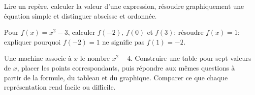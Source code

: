 \begin{prerequis}
Lire un repère, calculer la valeur d'une expression, résoudre graphiquement une
équation simple et distinguer abscisse et ordonnée.
\end{prerequis}
\begin{automatismes}
Pour $f(x)=x^2-3$, calculer $f(-2)$, $f(0)$ et $f(3)$; résoudre
$f(x)=1$; expliquer pourquoi $f(-2)=1$ ne signifie pas $f(1)=-2$.
\end{automatismes}
\begin{activite}
Une machine associe à $x$ le nombre $x^2-4$. Construire une table pour sept
valeurs de $x$, placer les points correspondants, puis répondre aux mêmes
questions à partir de la formule, du tableau et du graphique. Comparer ce que
chaque représentation rend facile ou difficile.
\end{activite}

